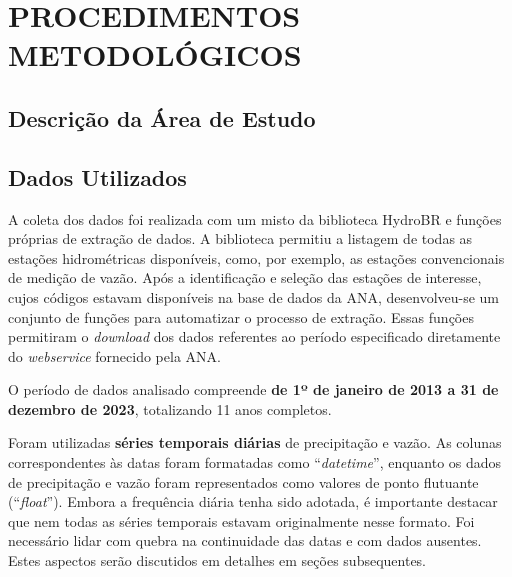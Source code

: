\chapter{PROCEDIMENTOS METODOLÓGICOS}
\section{Descrição da Área de Estudo}

\section{Dados Utilizados}

A coleta dos dados foi realizada com um misto da biblioteca HydroBR \cite{carvalho2020hydrobr} e funções próprias de extração de dados. A biblioteca permitiu a listagem de todas as estações hidrométricas disponíveis, como, por exemplo, as estações convencionais de medição de vazão. Após a identificação e seleção das estações de interesse, cujos códigos estavam disponíveis na base de dados da ANA, desenvolveu-se um conjunto de funções para automatizar o processo de extração. Essas funções permitiram o \textit{download} dos dados referentes ao período especificado diretamente do \textit{webservice} fornecido pela ANA.

O período de dados analisado compreende \textbf{de 1º de janeiro de 2013 a 31 de dezembro de 2023}, totalizando 11 anos completos.

Foram utilizadas \textbf{séries temporais diárias} de precipitação e vazão. As colunas correspondentes às datas foram formatadas como ``\textit{datetime}'', enquanto os dados de precipitação e vazão foram representados como valores de ponto flutuante (``\textit{float}''). Embora a frequência diária tenha sido adotada, é importante destacar que nem todas as séries temporais estavam originalmente nesse formato. Foi necessário lidar com quebra na continuidade das datas e com dados ausentes. Estes aspectos serão discutidos em detalhes em seções subsequentes.

